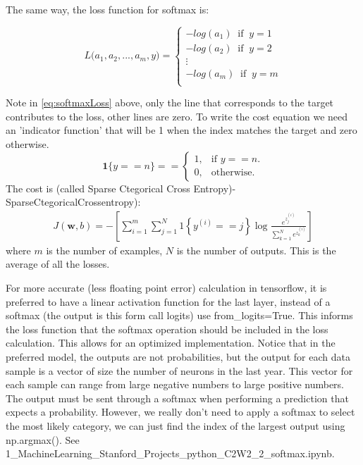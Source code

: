 \documentclass[12pt]{report}
\begin{document}
The same way, the loss function for softmax is:

\begin{equation}
  L\big( a_1, a_2, ..., a_m, y \big) =
  \begin{cases}
    -log ( a_1 )  \;\; \text{if} \;\; y = 1  \\
    -log ( a_2 )  \;\; \text{if} \;\; y = 2  \\
    \vdots\\
    -log ( a_m )  \;\; \text{if} \;\; y = m  \\
  \end{cases}
  \label{eq:softmaxLoss}
\end{equation}

Note in \ref{eq:softmaxLoss} above, only the line that corresponds to the target contributes to the loss, other lines are zero. To write the cost equation we need an 'indicator function' that will be 1 when the index matches the target and zero otherwise.
$$\mathbf{1}\{y == n\} = =\begin{cases}
  1, & \text{if $y==n$}.\\
  0, & \text{otherwise}.
\end{cases}$$
The cost is (called Sparse Ctegorical Cross Entropy)-SparseCtegoricalCrossentropy):
\begin{align}
  J(\mathbf{w},b) = - \left[ \sum_{i=1}^{m} \sum_{j=1}^{N}  1\left\{y^{(i)} == j\right\} \log \frac{e^{z^{(i)}_j}}{\sum_{k=1}^N e^{z^{(i)}_k} }\right] \tag{4}
\end{align}
where $m$ is the number of examples, $N$ is the number of outputs. This is the average of all the losses.

For more accurate (less floating point error) calculation in tensorflow, it is preferred to have a linear activation function for the last layer, instead of a softmax (the output is this form call logits) use from\_logits=True. This informs the loss function that the softmax operation should be included in the loss calculation. This allows for an optimized implementation. Notice that in the preferred model, the outputs are not probabilities, but the output for each data sample is a vector of size the number of neurons in the last year. This vector for each sample can range from large negative numbers to large positive numbers. The output must be sent through a softmax when performing a prediction that expects a probability. However, we really don't need to apply a softmax to select the most likely category, we can just find the index of the largest output using np.argmax(). See 1\_MachineLearning\_Stanford\_Projects\_python\_C2W2\_2\_softmax.ipynb.
\end{document}
